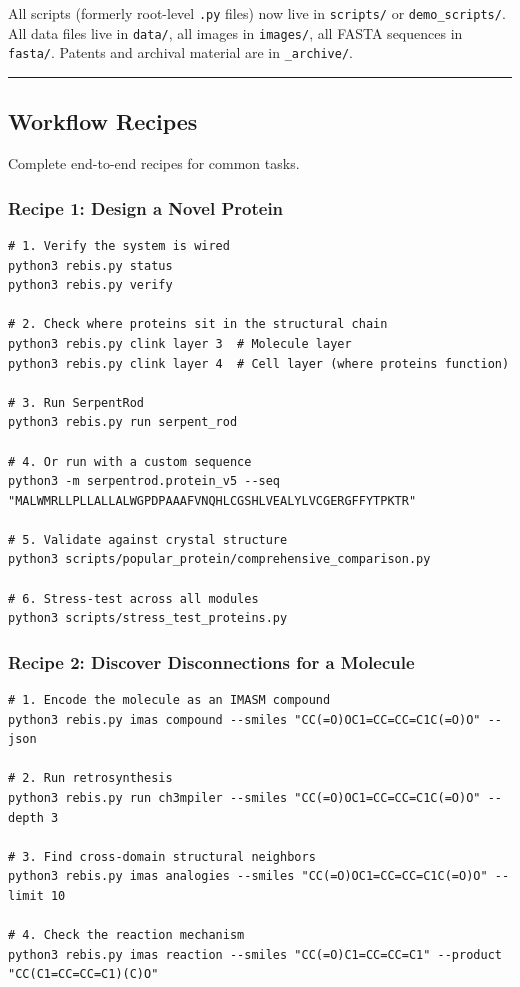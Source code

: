 \documentclass[12pt,a4paper]{article}
\begin{document}
All scripts (formerly root-level \texttt{.py} files) now live in
\texttt{scripts/} or \texttt{demo\_scripts/}. All data files live in
\texttt{data/}, all images in \texttt{images/}, all FASTA sequences in
\texttt{fasta/}. Patents and archival material are in
\texttt{\_archive/}.

\begin{center}\rule{0.5\linewidth}{0.5pt}\end{center}

\hypertarget{workflow-recipes}{%
\subsection{Workflow Recipes}\label{workflow-recipes}}

Complete end-to-end recipes for common tasks.

\hypertarget{recipe-1-design-a-novel-protein}{%
\subsubsection{Recipe 1: Design a Novel
Protein}\label{recipe-1-design-a-novel-protein}}

\begin{verbatim}
# 1. Verify the system is wired
python3 rebis.py status
python3 rebis.py verify

# 2. Check where proteins sit in the structural chain
python3 rebis.py clink layer 3  # Molecule layer
python3 rebis.py clink layer 4  # Cell layer (where proteins function)

# 3. Run SerpentRod
python3 rebis.py run serpent_rod

# 4. Or run with a custom sequence
python3 -m serpentrod.protein_v5 --seq "MALWMRLLPLLALLALWGPDPAAAFVNQHLCGSHLVEALYLVCGERGFFYTPKTR"

# 5. Validate against crystal structure
python3 scripts/popular_protein/comprehensive_comparison.py

# 6. Stress-test across all modules
python3 scripts/stress_test_proteins.py
\end{verbatim}

\hypertarget{recipe-2-discover-disconnections-for-a-molecule}{%
\subsubsection{Recipe 2: Discover Disconnections for a
Molecule}\label{recipe-2-discover-disconnections-for-a-molecule}}

\begin{verbatim}
# 1. Encode the molecule as an IMASM compound
python3 rebis.py imas compound --smiles "CC(=O)OC1=CC=CC=C1C(=O)O" --json

# 2. Run retrosynthesis
python3 rebis.py run ch3mpiler --smiles "CC(=O)OC1=CC=CC=C1C(=O)O" --depth 3

# 3. Find cross-domain structural neighbors
python3 rebis.py imas analogies --smiles "CC(=O)OC1=CC=CC=C1C(=O)O" --limit 10

# 4. Check the reaction mechanism
python3 rebis.py imas reaction --smiles "CC(=O)C1=CC=CC=C1" --product "CC(C1=CC=CC=C1)(C)O"
\end{verbatim}
\end{document}
